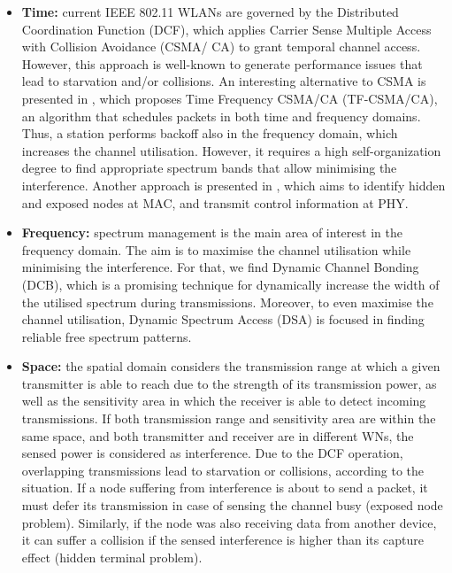 \documentclass[12pt, a4paper,twoside]{tesi_upf}
\begin{document}
			\begin{itemize}
				\item \textbf{Time:} current IEEE 802.11 WLANs are governed by the Distributed Coordination Function (DCF), which applies Carrier Sense Multiple Access with Collision Avoidance (CSMA/ CA) to grant temporal channel access. However, this approach is well-known to generate performance issues that lead to starvation and/or collisions. An interesting alternative to CSMA is presented in \cite{herzen2015csma}, which proposes Time Frequency CSMA/CA (TF-CSMA/CA), an algorithm that schedules packets in both time and frequency domains. Thus, a station performs backoff also in the frequency domain, which increases the channel utilisation. However, it requires a high self-organization degree to find appropriate spectrum bands that allow minimising the interference. Another approach is presented in \cite{wang2012combating}, which aims to identify hidden and exposed nodes at MAC, and transmit control information at PHY.			
				\item \textbf{Frequency:} spectrum management is the main area of interest in the frequency domain. The aim is to maximise the channel utilisation while minimising the interference. For that, we find Dynamic Channel Bonding (DCB), which is a promising technique for dynamically increase the width of the utilised spectrum during transmissions. Moreover, to even maximise the channel utilisation, Dynamic Spectrum Access (DSA) is focused in finding reliable free spectrum patterns.
				\item \textbf{Space:} the spatial domain considers the transmission range at which a given transmitter is able to reach due to the strength of its transmission power, as well as the sensitivity area in which the receiver is able to detect incoming transmissions. If both transmission range and sensitivity area are within the same space, and both transmitter and receiver are in different WNs, the sensed power is considered as interference. Due to the DCF operation, overlapping transmissions lead to starvation or collisions, according to the situation. If a node suffering from interference is about to send a packet, it must defer its transmission in case of sensing the channel busy (exposed node problem). Similarly, if the node was also receiving data from another device, it can suffer a collision if the sensed interference is higher than its capture effect (hidden terminal problem).
			\end{itemize}		
				
\end{document}
